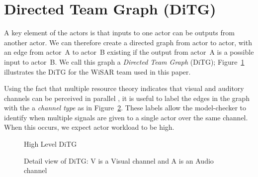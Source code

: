 \section{Directed Team Graph (DiTG)}
A key element of the actors is that inputs to one actor can be outputs from another actor.  We can therefore create a directed graph from actor to actor, with an edge from actor~A to actor~B existing if the output from actor~A is a possible input to actor~B.  We call this graph a {\em Directed Team Graph} (DiTG); Figure~\ref{fig:ditg} illustrates the DiTG for the WiSAR team used in this paper.   

Using the fact that multiple resource theory indicates that visual and auditory channels can be perceived in parallel \cite{wickens2002multiple}, it is useful to label the edges in the graph with the a {\em channel type} as in Figure~\ref{fig:ditg_detail}.  These labels allow the model-checker to identify when multiple signals are given to a single actor over the same channel.  When this occurs, we expect actor workload to be high.


\begin{figure}[hbt]
\center
\setlength{\abovecaptionskip}{1mm}
\setlength{\belowcaptionskip}{1mm}
\setlength{\textfloatsep}{1mm}
\setlength{\floatsep}{1mm}
\caption{High Level DiTG}
\label{fig:ditg}
\end{figure}

\begin{figure}[hbt]
\center
\setlength{\abovecaptionskip}{1mm}
\setlength{\belowcaptionskip}{1mm}
\setlength{\textfloatsep}{1mm}
\setlength{\floatsep}{1mm}
\caption{Detail view of DiTG: V is a Visual channel and A is an Audio channel}
\label{fig:ditg_detail}
\end{figure}


